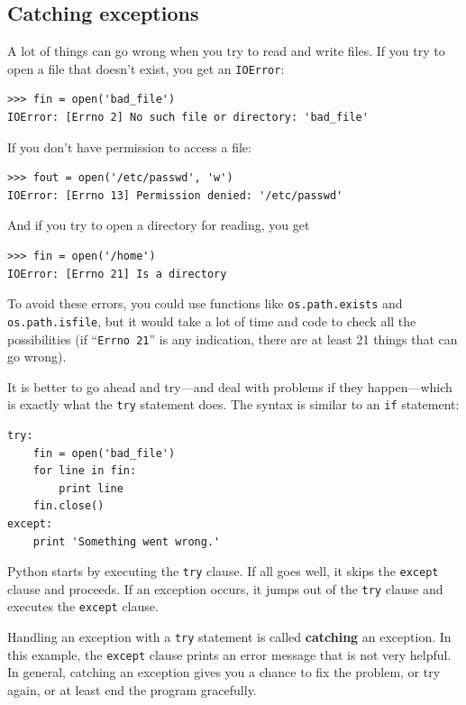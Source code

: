 \documentclass[10pt]{book}
\begin{document}
\begin{CJK}{UTF8}{gbsn}
\section{Catching exceptions}
\label{catch}

A lot of things can go wrong when you try to read and write
files.  If you try to open a file that doesn't exist, you get an
{\tt IOError}:

\begin{verbatim}
>>> fin = open('bad_file')
IOError: [Errno 2] No such file or directory: 'bad_file'
\end{verbatim}
%
If you don't have permission to access a file:

\begin{verbatim}
>>> fout = open('/etc/passwd', 'w')
IOError: [Errno 13] Permission denied: '/etc/passwd'
\end{verbatim}
%
And if you try to open a directory for reading, you get

\begin{verbatim}
>>> fin = open('/home')
IOError: [Errno 21] Is a directory
\end{verbatim}
%
To avoid these errors, you could use functions like {\tt os.path.exists}
and {\tt os.path.isfile}, but it would take a lot of time and code
to check all the possibilities (if ``{\tt Errno 21}'' is any
indication, there are at least 21 things that can go wrong).

It is better to go ahead and try---and deal with problems if they
happen---which is exactly what the {\tt try} statement does.  The
syntax is similar to an {\tt if} statement:

\begin{verbatim}
try:    
    fin = open('bad_file')
    for line in fin:
        print line
    fin.close()
except:
    print 'Something went wrong.'
\end{verbatim}
%
Python starts by executing the {\tt try} clause.  If all goes
well, it skips the {\tt except} clause and proceeds.  If an
exception occurs, it jumps out of the {\tt try} clause and
executes the {\tt except} clause.

Handling an exception with a {\tt try} statement is called {\bf
catching} an exception.  In this example, the {\tt except} clause
prints an error message that is not very helpful.  In general,
catching an exception gives you a chance to fix the problem, or try
again, or at least end the program gracefully.


\end{CJK}
\end{document}
